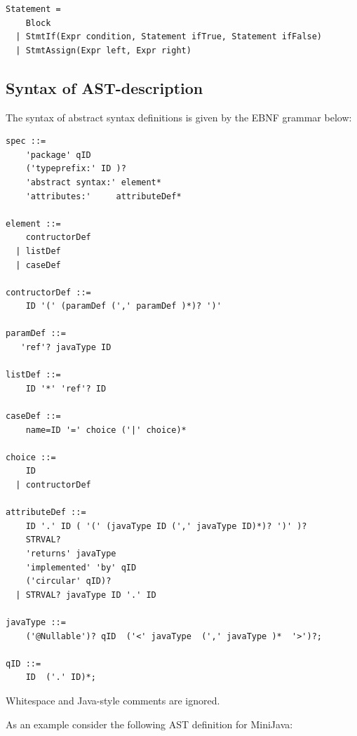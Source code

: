 \documentclass{scrartcl}
\begin{document}
\begin{lstlisting}
Statement =
    Block
  | StmtIf(Expr condition, Statement ifTrue, Statement ifFalse)
  | StmtAssign(Expr left, Expr right)
\end{lstlisting}


\subsection{Syntax of AST-description}

The syntax of abstract syntax definitions is given by the EBNF grammar below:

\lstset{upquote=true}
\begin{lstlisting}[stringstyle=\ttfamily\color{blue!50!red},morekeywords={?,*}]
spec ::=
    'package' qID
    ('typeprefix:' ID )?
    'abstract syntax:' element*
    'attributes:'     attributeDef*

element ::=
    contructorDef
  | listDef
  | caseDef

contructorDef ::=
    ID '(' (paramDef (',' paramDef )*)? ')'

paramDef ::=
   'ref'? javaType ID

listDef ::=
    ID '*' 'ref'? ID

caseDef ::=
    name=ID '=' choice ('|' choice)*

choice ::=
    ID
  | contructorDef

attributeDef ::=
    ID '.' ID ( '(' (javaType ID (',' javaType ID)*)? ')' )?
    STRVAL?
    'returns' javaType
    'implemented' 'by' qID
    ('circular' qID)?
  | STRVAL? javaType ID '.' ID

javaType ::=
    ('@Nullable')? qID  ('<' javaType  (',' javaType )*  '>')?;

qID ::=
    ID  ('.' ID)*;
\end{lstlisting}

Whitespace and Java-style comments are ignored.

As an example consider the following AST definition for MiniJava:
\end{document}
